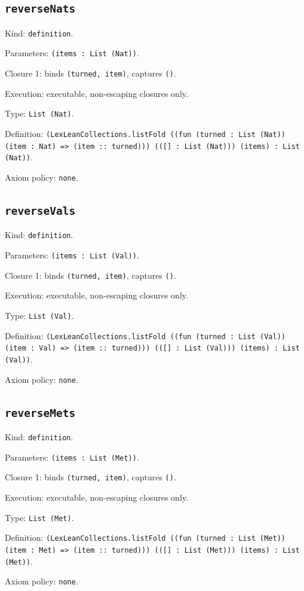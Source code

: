\documentclass[11pt]{article}
\begin{document}
\subsection*{\texttt{reverseNats}}
\noindent Kind: \texttt{definition}.\par
\noindent Parameters: \texttt{(items : List (Nat))}.\par
\noindent Closure 1: binds \texttt{(turned, item)}, captures \texttt{()}.\par
\noindent Execution: executable, non-escaping closures only.\par
\noindent Type: \texttt{List (Nat)}.\par
\noindent Definition: \texttt{(LexLeanCollections.listFold ((fun (turned : List (Nat)) (item : Nat) => (item :: turned))) (([] : List (Nat))) (items) : List (Nat))}.\par
\noindent Axiom policy: \texttt{none}.\par
\subsection*{\texttt{reverseVals}}
\noindent Kind: \texttt{definition}.\par
\noindent Parameters: \texttt{(items : List (Val))}.\par
\noindent Closure 1: binds \texttt{(turned, item)}, captures \texttt{()}.\par
\noindent Execution: executable, non-escaping closures only.\par
\noindent Type: \texttt{List (Val)}.\par
\noindent Definition: \texttt{(LexLeanCollections.listFold ((fun (turned : List (Val)) (item : Val) => (item :: turned))) (([] : List (Val))) (items) : List (Val))}.\par
\noindent Axiom policy: \texttt{none}.\par
\subsection*{\texttt{reverseMets}}
\noindent Kind: \texttt{definition}.\par
\noindent Parameters: \texttt{(items : List (Met))}.\par
\noindent Closure 1: binds \texttt{(turned, item)}, captures \texttt{()}.\par
\noindent Execution: executable, non-escaping closures only.\par
\noindent Type: \texttt{List (Met)}.\par
\noindent Definition: \texttt{(LexLeanCollections.listFold ((fun (turned : List (Met)) (item : Met) => (item :: turned))) (([] : List (Met))) (items) : List (Met))}.\par
\noindent Axiom policy: \texttt{none}.\par
\end{document}
